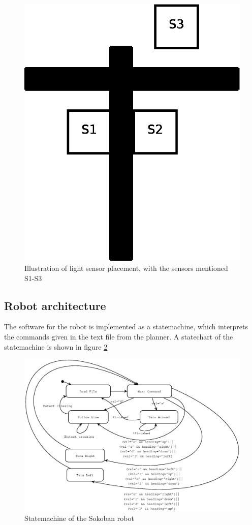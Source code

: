 \documentclass[draft, english, a4paper]{article}
\begin{document}
	    \begin{figure}[htp]
            \centering
    	    \includegraphics[scale=0.45]{lightSensorPlacement}
	        \caption{Illustration of light sensor placement, with the sensors mentioned S1-S3}\label{fig:lightSensorPlacement}
        \end{figure}	      
	\subsection{Robot architecture}
	    The software for the robot is implemented as a statemachine, which
	    interprets the commands given in the text file from the planner.
	    A statechart of the statemachine is shown in figure \ref{fig:RobotStateChart}
	    \begin{figure}[htp]
            \centering
    	    \includegraphics[scale=0.6]{TopLevelStateChart}
	        \caption{Statemachine of the Sokoban robot}\label{fig:RobotStateChart}
        \end{figure}
\end{document}
